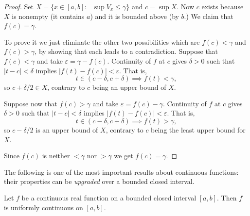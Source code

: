 \begin{proof}
  Set $X = \{ x \in [a,b] \colon \text{ $\sup V_x \leqslant \gamma$} \}$ and $c = \sup X$.
  Now $c$ exists because $X$ is nonempty (it contains $a$) and it is bounded above (by $b$.)
  We claim that $f(c) = \gamma$.

  To prove it we just eliminate the other two possibilities which are $f(c) < \gamma$ and $f(c) > \gamma$, by showing that each leads to a contradiction.
  Suppose that $f(c) < \gamma$ and take $\varepsilon = \gamma - f(c)$.
  Continuity of $f$ at $c$ gives $\delta > 0$ such that $|t - c| < \delta$ implies $|f(t) - f(c)| < \varepsilon$.  That is,
  \[
    t \in (c-\delta, c+\delta) \implies f(t) < \gamma,
  \]
  so $c + \delta/2 \in X$, contrary to $c$ being an upper bound of $X$.


  Suppose now that $f(c) > \gamma$ and take $\varepsilon = f(c) - \gamma$.
  Continuity of $f$ at $c$ gives $\delta > 0$ such that $|t - c| < \delta$ implies $|f(t) - f(c)| < \varepsilon$.  That is,
  \[
    t \in (c-\delta, c+\delta) \implies f(t) > \gamma,
  \]
  so $c - \delta/2$ is an upper bound of $X$, contrary to $c$ being the least upper bound for $X$.

  Since $f(c)$ is neither $< \gamma$ nor $> \gamma$ we get $f(c) = \gamma$.
\end{proof}

The following is one of the most important results about continuous functions: their properties can be \textit{upgraded} over a bounded closed interval.

  \begin{thm}
    \label{thm:unif-cont}
   Let $f$ be a continuous real function on a bounded closed interval $[a,b]$.
   Then $f$ is uniformly continuous on $[a,b]$.
  \end{thm}

